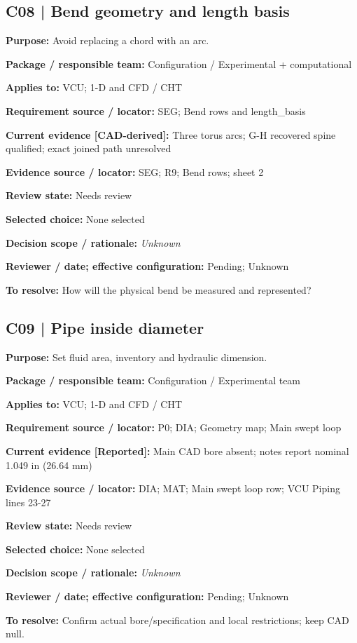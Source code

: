\documentclass[11pt]{article}
\begin{document}
\begin{minipage}{\textwidth}\small\setlength{\parskip}{2pt}
\subsection*{C08 | Bend geometry and length basis}
\textbf{Purpose:} Avoid replacing a chord with an arc.\par
\textbf{Package / responsible team:} Configuration / Experimental + computational\par
\textbf{Applies to:} VCU; 1-D and CFD / CHT\par
\textbf{Requirement source / locator:} SEG; Bend rows and length\_\allowbreak{}basis\par
\textbf{Current evidence [CAD-derived]:} Three torus arcs; G-H recovered spine qualified; exact joined path unresolved\par
\textbf{Evidence source / locator:} SEG; R9; Bend rows; sheet 2\par
\textbf{Review state:} Needs review\par
\textbf{Selected choice:} None selected\par
\textbf{Decision scope / rationale:} \textit{Unknown}\par
\textbf{Reviewer / date; effective configuration:} Pending; Unknown\par
\textbf{To resolve:} How will the physical bend be measured and represented?\par
\end{minipage}\par\vspace{5pt}
\begin{minipage}{\textwidth}\small\setlength{\parskip}{2pt}
\subsection*{C09 | Pipe inside diameter}
\textbf{Purpose:} Set fluid area, inventory and hydraulic dimension.\par
\textbf{Package / responsible team:} Configuration / Experimental team\par
\textbf{Applies to:} VCU; 1-D and CFD / CHT\par
\textbf{Requirement source / locator:} P0; DIA; Geometry map; Main swept loop\par
\textbf{Current evidence [Reported]:} Main CAD bore absent; notes report nominal 1.049 in (26.64 mm)\par
\textbf{Evidence source / locator:} DIA; MAT; Main swept loop row; VCU Piping lines 23-27\par
\textbf{Review state:} Needs review\par
\textbf{Selected choice:} None selected\par
\textbf{Decision scope / rationale:} \textit{Unknown}\par
\textbf{Reviewer / date; effective configuration:} Pending; Unknown\par
\textbf{To resolve:} Confirm actual bore/specification and local restrictions; keep CAD null.\par
\end{minipage}\par\vspace{5pt}
\end{document}

